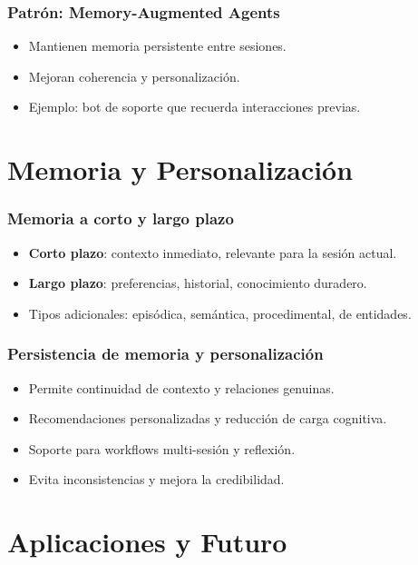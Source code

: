 \documentclass[aspectratio=169,xcolor=dvipsnames, t]{beamer}
\begin{document}
\begin{frame}
\frametitle{Patrón: Memory-Augmented Agents}
\begin{itemize}
    \item Mantienen memoria persistente entre sesiones.
    \item Mejoran coherencia y personalización.
    \item Ejemplo: bot de soporte que recuerda interacciones previas.
\end{itemize}
\end{frame}

\section{Memoria y Personalización}

\begin{frame}
\frametitle{Memoria a corto y largo plazo}
\begin{itemize}
    \item \textbf{Corto plazo}: contexto inmediato, relevante para la sesión actual.
    \item \textbf{Largo plazo}: preferencias, historial, conocimiento duradero.
    \item Tipos adicionales: episódica, semántica, procedimental, de entidades.
\end{itemize}
\end{frame}

\begin{frame}
\frametitle{Persistencia de memoria y personalización}
\begin{itemize}
    \item Permite continuidad de contexto y relaciones genuinas.
    \item Recomendaciones personalizadas y reducción de carga cognitiva.
    \item Soporte para workflows multi-sesión y reflexión.
    \item Evita inconsistencias y mejora la credibilidad.
\end{itemize}
\end{frame}

\section{Aplicaciones y Futuro}
\end{document}
